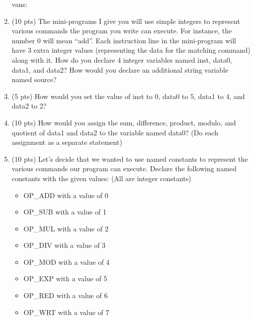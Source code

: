 \documentclass[letterpaper,12pt]{article}
\begin{document}
\begin{enumerate}
            vans:
    \item (10 pts) The mini-programs I give you will use simple integers to represent various
          commands the program you write can execute. For instance, the number 0 will mean “add”.
          Each instruction line in the mini-program will have 3 extra integer values (representing the data
          for the matching command) along with it.
          How do you declare 4 integer variables named inst, data0, data1, and data2?
          How would you declare an additional string variable named source?
    \vspace{40mm}
    \item (5 pts) How would you set the value of inst to 0, data0 to 5, data1 to 4, and data2 to 2?
    \vspace{40mm}
    \item (10 pts) How would you assign the sum, difference, product, modulo, and quotient
          of data1 and data2 to the variable named data0? (Do each assignment as a separate statement)
    \vspace{40mm}
    \item (10 pts) Let’s decide that we wanted to use named constants to represent the various
          commands our program can execute. Declare the following named constants with the given values:
          (All are integer constants)
            \begin{itemize}
                \item OP\_ADD with a value of 0
                \item OP\_SUB with a value of 1
                \item OP\_MUL with a value of 2
                \item OP\_DIV with a value of 3
                \item OP\_MOD with a value of 4
                \item OP\_EXP with a value of 5
                \item OP\_RED with a value of 6
                \item OP\_WRT with a value of 7
            \end{itemize}


\end{enumerate}
\end{document}
